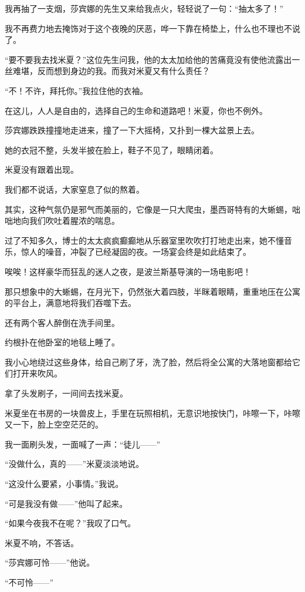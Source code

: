 \par 我再抽了一支烟，莎宾娜的先生又来给我点火，轻轻说了一句：“抽太多了！”
\par 我不再费力地去掩饰对于这个夜晚的厌恶，哗一下靠在椅垫上，什么也不理也不说了。
\par “要不要我去找米夏？”这位先生问我，他的太太加给他的苦痛竟没有使他流露出一丝难堪，反而想到身边的我。而我对米夏又有什么责任？
\par “不！不许，拜托你。”我拉住他的衣袖。
\par 在这儿，人人是自由的，选择自己的生命和道路吧！米夏，你也不例外。
\par 莎宾娜跌跌撞撞地走进来，撞了一下大摇椅，又扑到一棵大盆景上去。
\par 她的衣冠不整，头发半披在脸上，鞋子不见了，眼睛闭着。
\par 米夏没有跟着出现。
\par 我们都不说话，大家窒息了似的熬着。
\par 其实，这种气氛仍是邪气而美丽的，它像是一只大爬虫，墨西哥特有的大蜥蜴，咄咄地向我们吹吐着腥浓的喘息。
\par 过了不知多久，博士的太太疯疯癫癫地从乐器室里吹吹打打地走出来，她不懂音乐，惊人的噪音，冲裂了已经凝固的夜。一场宴会终是如此结束了。
\par 唉唉！这样豪华而狂乱的迷人之夜，是波兰斯基导演的一场电影吧！
\par 那只想象中的大蜥蜴，在月光下，仍然张大着四肢，半眯着眼睛，重重地压在公寓的平台上，满意地将我们吞噬下去。
\par 
\par 还有两个客人醉倒在洗手间里。
\par 约根扑在他卧室的地毯上睡了。
\par 我小心地绕过这些身体，给自己刷了牙，洗了脸，然后将全公寓的大落地窗都给它们打开来吹风。
\par 拿了头发刷子，一间间去找米夏。
\par 米夏坐在书房的一块兽皮上，手里在玩照相机，无意识地按快门，咔嚓一下，咔嚓又一下，脸上空空茫茫的。
\par 我一面刷头发，一面喊了一声：“徒儿——”
\par “没做什么，真的——”米夏淡淡地说。
\par “这没什么要紧，小事情。”我说。
\par “可是我没有做——”他叫了起来。
\par “如果今夜我不在呢？”我叹了口气。
\par 米夏不响，不答话。
\par “莎宾娜可怜——”他说。
\par “不可怜——”
